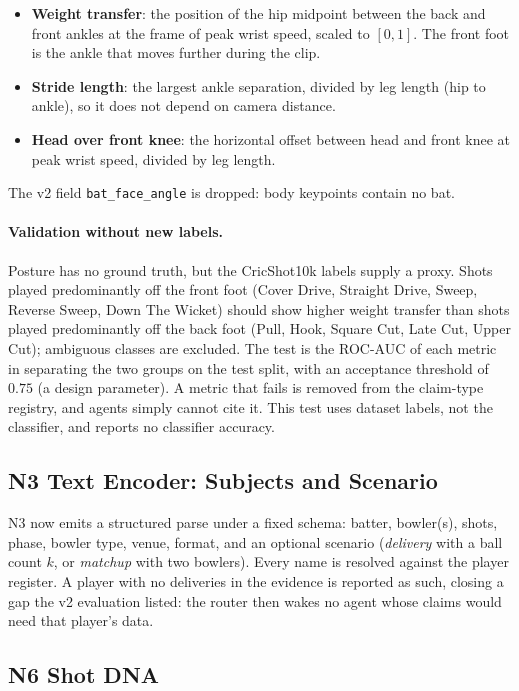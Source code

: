 \documentclass[11pt,a4paper]{article}
\begin{document}
\begin{itemize}[nosep,leftmargin=1.6em]
\item \textbf{Weight transfer}: the position of the hip midpoint between the
  back and front ankles at the frame of peak wrist speed, scaled to $[0,1]$.
  The front foot is the ankle that moves further during the clip.
\item \textbf{Stride length}: the largest ankle separation, divided by leg
  length (hip to ankle), so it does not depend on camera distance.
\item \textbf{Head over front knee}: the horizontal offset between head and
  front knee at peak wrist speed, divided by leg length.
\end{itemize}

\noindent The v2 field \texttt{bat\_face\_angle} is dropped: body keypoints
contain no bat.

\paragraph{Validation without new labels.} Posture has no ground truth, but the
CricShot10k labels supply a proxy. Shots played predominantly off the front
foot (Cover Drive, Straight Drive, Sweep, Reverse Sweep, Down The Wicket) should
show higher weight transfer than shots played predominantly off the back foot
(Pull, Hook, Square Cut, Late Cut, Upper Cut); ambiguous classes are excluded.
The test is the ROC-AUC of each metric in separating the two groups on the test
split, with an acceptance threshold of $0.75$ (a design parameter). A metric
that fails is removed from the claim-type registry, and agents simply cannot
cite it. This test uses dataset labels, not the classifier, and reports no
classifier accuracy.

\subsection{N3 Text Encoder: Subjects and Scenario}

N3 now emits a structured parse under a fixed schema: batter, bowler(s), shots,
phase, bowler type, venue, format, and an optional scenario
(\emph{delivery} with a ball count $k$, or \emph{matchup} with two bowlers).
Every name is resolved against the player register. A player with no deliveries
in the evidence is reported as such, closing a gap the v2 evaluation listed: the
router then wakes no agent whose claims would need that player's data.

\subsection{N6 Shot DNA}
\end{document}
